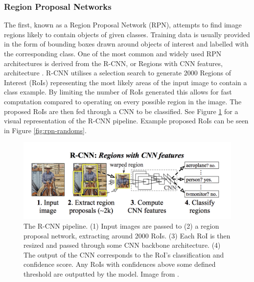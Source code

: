 \subsubsection{Region Proposal Networks}\label{ch:Background,sec:objectDetection,sub:RPN}

The first, known as a Region Proposal Network (RPN), attempts to find image regions likely to contain objects of given classes. Training data is usually provided in the form of bounding boxes drawn around objects of interest and labelled with the corresponding class. One of the most common and widely used RPN architectures is derived from the R-CNN, or Regions with CNN features, architecture \cite{girshick_rich_2014}. R-CNN utilises a selection search \cite{uijlings_selective_2013} to generate 2000 Regions of Interest (RoIs) representing the most likely areas of the input image to contain a class example. By limiting the number of RoIs generated this allows for fast computation compared to operating on every possible region in the image. The proposed RoIs are then fed through a CNN to be classified. See Figure \ref{fig:r-cnn} for a visual representation of the R-CNN pipeline. Example proposed RoIs can be seen in Figure \ref{fig:rpn-randoms}.

\begin{figure}
	\begin{center}
		\includegraphics[scale=0.45]{Chapter2/figs/r-cnn.png}
	\end{center}
	\caption[The R-CNN pipeline.]{The R-CNN pipeline. (1) Input images are passed to (2) a region proposal network, extracting around 2000 RoIs. (3) Each RoI is then resized and passed through some CNN backbone architecture. (4) The output of the CNN corresponds to the RoI's classification and confidence score. Any RoIs with confidences above some defined threshold are outputted by the model. Image from \cite{girshick_rich_2014}.}
	\label{fig:r-cnn}
\end{figure}

